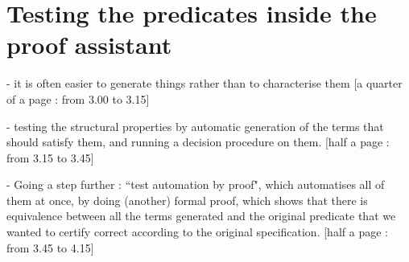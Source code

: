 \section{Testing the predicates inside the proof assistant}

\label{sect:testingInside}

- it is often easier to generate things rather than to characterise them 
[a quarter of a page : from 3.00 to 3.15]

- testing the structural properties by automatic generation of the terms that should satisfy them, and running a decision procedure on them.
[half a page : from 3.15 to 3.45]

- Going a step further : ``test automation by proof", which automatises all of them at once, by doing (another) formal proof, which shows that there is equivalence between all the terms generated and the original predicate that we wanted to certify correct according to the original specification.
[half a page : from 3.45 to 4.15]